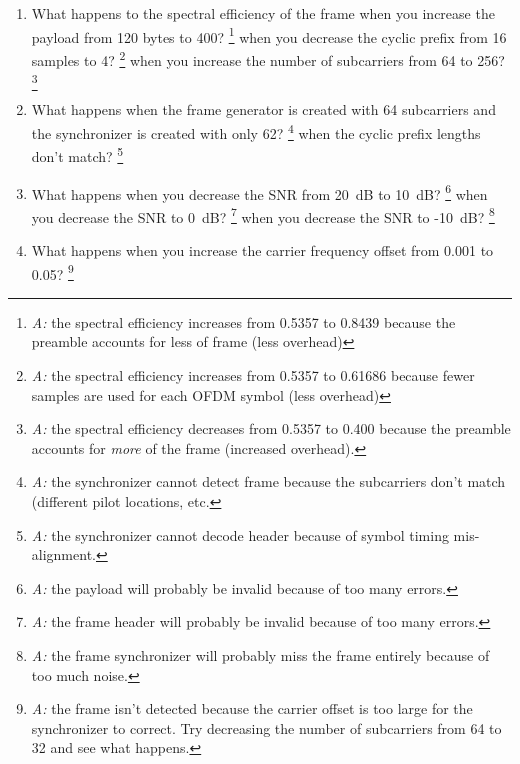 \begin{enumerate}
\item What happens to the spectral efficiency of the frame when you
      increase the payload from 120 bytes to 400?%
      \footnote{{\em A:} the spectral efficiency increases from 0.5357
                to 0.8439 because the preamble accounts for less of
                frame (less overhead)}
      when you decrease the cyclic prefix from 16 samples to 4?%
      \footnote{{\em A:} the spectral efficiency increases from 0.5357
                to 0.61686 because fewer samples are used for each OFDM
                symbol (less overhead)}
      when you increase the number of subcarriers from 64 to 256?%
      \footnote{{\em A:} the spectral efficiency decreases from 0.5357
                to 0.400 because the preamble accounts for {\em more} of
                the frame (increased overhead).}
\item What happens when the frame generator is created with 64
      subcarriers and the synchronizer is created with only 62?%
      \footnote{{\em A:} the synchronizer cannot detect frame
                because the subcarriers don't match (different pilot
                locations, etc.}
      when the cyclic prefix lengths don't match?%
      \footnote{{\em A:} the synchronizer cannot decode header because of
                symbol timing  mis-alignment.}
\item What happens when you decrease the SNR from 20~dB to 10~dB?%
      \footnote{{\em A:} the payload will probably be invalid because of
                too many errors.}
      when you decrease the SNR to 0~dB?%
      \footnote{{\em A:} the frame header will probably be invalid
                because of too many errors.}
      when you decrease the SNR to -10~dB?%
      \footnote{{\em A:} the frame synchronizer will probably miss the
                frame entirely because of too much noise.}
\item What happens when you increase the carrier frequency offset from
      0.001 to 0.05?%
      \footnote{{\em A:} the frame isn't detected because the carrier
                offset is too large for the synchronizer to correct.
                Try decreasing the number of subcarriers from 64 to 32
                and see what happens.}
\end{enumerate}

